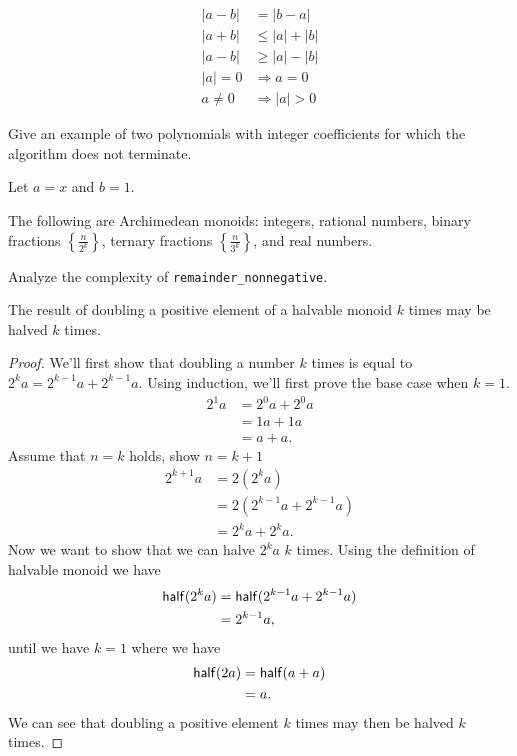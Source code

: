 \begin{lemma}
	\begin{align*}
		|a - b| &= |b - a|\\
		|a + b| &\leq |a| + |b|\\
		|a - b| &\geq |a| - |b|\\
		|a| = 0 &\Rightarrow a = 0\\
		a \neq 0 &\Rightarrow |a| > 0
	\end{align*}
\end{lemma}

\begin{exercise}
	Give an example of two polynomials with integer coefficients for which
	the algorithm does not terminate.
\end{exercise}

\begin{solution}
	Let $a = x$ and $b = 1$.
\end{solution}

\begin{lemma}
	The following are Archimedean monoids: integers, rational numbers, binary fractions
	$\left\{\frac{n}{2^k}\right\}$, ternary fractions $\left\{\frac{n}{3^k}\right\}$, and
	real numbers.
\end{lemma}

\begin{exercise}
	Analyze the complexity of \verb|remainder_nonnegative|.
\end{exercise}

\begin{lemma}
	The result of doubling a positive element of a halvable monoid $k$ times may be
	halved $k$ times.
\end{lemma}

\begin{proof}
	We'll first show that doubling a number $k$ times is equal to $2^ka = 2^{k-1}a + 2^{k-1}a$.
	Using induction, we'll first prove the base case when $k = 1$.
	\begin{align*}
		2^1a &= 2^0a + 2^0a\\
		     &= 1a + 1a\\
		     &= a + a.
	\end{align*}
	Assume that $n=k$ holds, show $n = k + 1$
	\begin{align*}
		2^{k+1}a &= 2(2^ka)\\
			 &= 2(2^{k-1}a + 2^{k-1}a)\\
			 &= 2^ka + 2^ka.
	\end{align*}
	Now we want to show that we can halve $2^ka$ $k$ times. Using the definition of halvable
	monoid we have
	\begin{align*}
		\mathsf{half}(2^ka) &= \mathsf{half}(2^{k-1}a + 2^{k-1}a)\\
		&= 2^{k-1}a,
	\end{align*}
	until we have $k=1$ where we have
	\begin{align*}
		\mathsf{half}(2a) &= \mathsf{half}(a + a)\\
		&= a.
	\end{align*}
	We can see that doubling a positive element $k$ times may then be halved $k$ times.
\end{proof}

